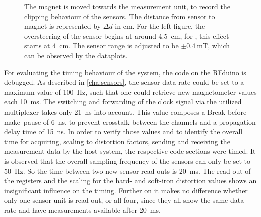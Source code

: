 \begin{figure}[!htb]
\hfill
{}
\caption[Clipping behaviour of sensor]
{The magnet is moved towards the measurement unit, to record the clipping behaviour of the sensors. The distance from sensor to magnet is represented by $ \Delta d $ in \si{\cm}. For the left figure, the oversteering of the sensor begins at around \SI{4.5}{\cm}, for \label{fig:posClip}, this effect starts at \SI{4}{\cm}. The sensor range is adjusted to be $ \pm \SI{0.4}{\milli \tesla} $, which can be observed by the dataplots.}
\label{fig:clipping}
\end{figure}
For evaluating the timing behaviour of the system, the code on the RFduino is debugged. As described in \ref{cha:sensors}, the sensor data rate could be set to a maximum value of \SI{100}{\Hz}, such that one could retrieve new magnetometer values each \SI{10}{\milli \second}. The switching and forwarding of the clock signal via the utilized multiplexer takes only \SI{21}{\nano \second} into account. This value composes a \grqq Break-before-make\grqq \, pause of \SI{6}{\nano \second}, to prevent crosstalk between the channels and a propagation delay time of \SI{15}{\nano \second}. In order to verify those values and to identify the overall time for acquiring, scaling to distortion factors, sending and receiving the measurement data by the host system, the respective code sections were timed. It is observed that the overall sampling frequency of the sensors can only be set to \SI{50}{\Hz}. So the time between two new sensor read outs is \SI{20}{\milli \second}. The read out of the registers and the scaling for the hard- and soft-iron distortion values shows an insignificant influence on the timing. Further on it makes no difference whether only one sensor unit is read out, or all four, since they all show the same data rate and have measurements available after \SI{20}{\milli \second}.\\
